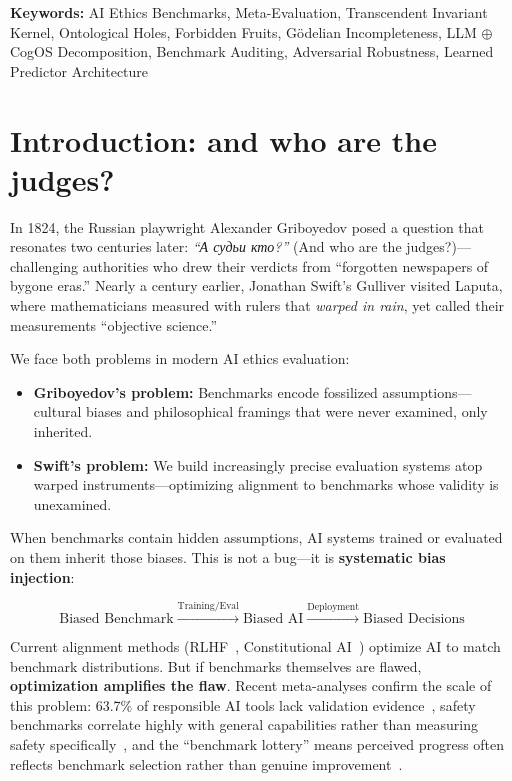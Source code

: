 \documentclass[11pt]{article}
\begin{document}
\vspace{1em}

\noindent\textbf{Keywords:} AI Ethics Benchmarks, Meta-Evaluation, Transcendent Invariant Kernel, Ontological Holes, Forbidden Fruits, G\"{o}delian Incompleteness, LLM $\oplus$ CogOS Decomposition, Benchmark Auditing, Adversarial Robustness, Learned Predictor Architecture


\section{Introduction: and who are the judges?}
\label{sec:intro}

In 1824, the Russian playwright Alexander Griboyedov posed a question that resonates two centuries later: \textit{``\foreignlanguage{russian}{А судьи кто?}''} (And who are the judges?)---challenging authorities who drew their verdicts from ``forgotten newspapers of bygone eras.'' Nearly a century earlier, Jonathan Swift's Gulliver visited Laputa, where mathematicians measured with rulers that \textit{warped in rain}, yet called their measurements ``objective science.''

We face both problems in modern AI ethics evaluation:

\begin{itemize}
\item \textbf{Griboyedov's problem:} Benchmarks encode fossilized assumptions---cultural biases and philosophical framings that were never examined, only inherited.
\item \textbf{Swift's problem:} We build increasingly precise evaluation systems atop warped instruments---optimizing alignment to benchmarks whose validity is unexamined.
\end{itemize}

When benchmarks contain hidden assumptions, AI systems trained or evaluated on them inherit those biases. This is not a bug---it is \textbf{systematic bias injection}:

\vspace{-0.3em}
\[
\text{Biased Benchmark} \xrightarrow{\text{Training/Eval}} \text{Biased AI} \xrightarrow{\text{Deployment}} \text{Biased Decisions}
\]
\vspace{-0.3em}

Current alignment methods (RLHF~\citep{openai2022rlhf}, Constitutional AI~\citep{bai2022constitutional}) optimize AI to match benchmark distributions. But if benchmarks themselves are flawed, \textbf{optimization amplifies the flaw}. Recent meta-analyses confirm the scale of this problem: 63.7\% of responsible AI tools lack validation evidence~\citep{kuehnert2025responsible}, safety benchmarks correlate highly with general capabilities rather than measuring safety specifically~\citep{ren2024safetywashing}, and the ``benchmark lottery'' means perceived progress often reflects benchmark selection rather than genuine improvement~\citep{dehghani2021benchmark}.
\end{document}
